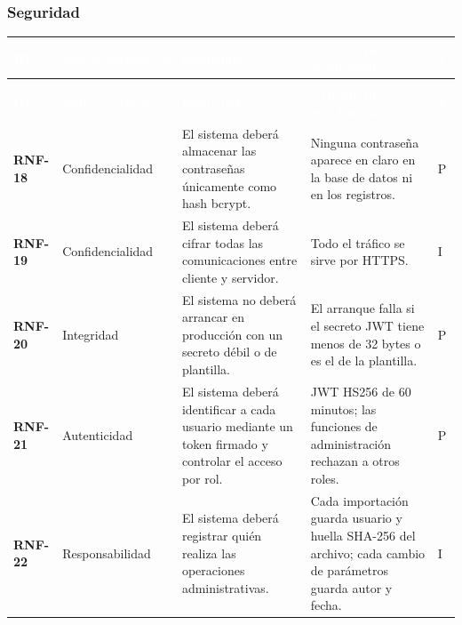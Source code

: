 \documentclass[11pt,a4paper,oneside]{article}
\begin{document}
\subsubsection{Seguridad}

{\footnotesize
\begin{xltabular}{\textwidth}{@{}>{\sffamily\bfseries}p{1.45cm}>{\raggedright\arraybackslash}p{2.4cm}YY>{\raggedright\arraybackslash}p{0.45cm}@{}}
\textcolor{white}{\sffamily\bfseries\footnotesize ID} & \textcolor{white}{\sffamily\bfseries\footnotesize Subcaracterística} & \textcolor{white}{\sffamily\bfseries\footnotesize Enunciado} & \textcolor{white}{\sffamily\bfseries\footnotesize Criterio de aceptación} & \textcolor{white}{\sffamily\bfseries\footnotesize V}\\
\endfirsthead
{}\\
\textcolor{white}{\sffamily\bfseries\footnotesize ID} & \textcolor{white}{\sffamily\bfseries\footnotesize Subcaracterística} & \textcolor{white}{\sffamily\bfseries\footnotesize Enunciado} & \textcolor{white}{\sffamily\bfseries\footnotesize Criterio de aceptación} & \textcolor{white}{\sffamily\bfseries\footnotesize V}\\
\endhead
RNF-18 & Confidencialidad & El sistema deberá almacenar las contraseñas únicamente como hash bcrypt. & Ninguna contraseña aparece en claro en la base de datos ni en los registros. & P\\ \hline
{}RNF-19 & Confidencialidad & El sistema deberá cifrar todas las comunicaciones entre cliente y servidor. & Todo el tráfico se sirve por HTTPS. & I\\ \hline
RNF-20 & Integridad & El sistema no deberá arrancar en producción con un secreto débil o de plantilla. & El arranque falla si el secreto JWT tiene menos de 32 bytes o es el de la plantilla. & P\\ \hline
{}RNF-21 & Autenticidad & El sistema deberá identificar a cada usuario mediante un token firmado y controlar el acceso por rol. & JWT HS256 de 60 minutos; las funciones de administración rechazan a otros roles. & P\\ \hline
RNF-22 & Responsabilidad & El sistema deberá registrar quién realiza las operaciones administrativas. & Cada importación guarda usuario y huella SHA-256 del archivo; cada cambio de parámetros guarda autor y fecha. & I\\ \hline
\end{xltabular}}
\vspace{0.6em}
\end{document}
